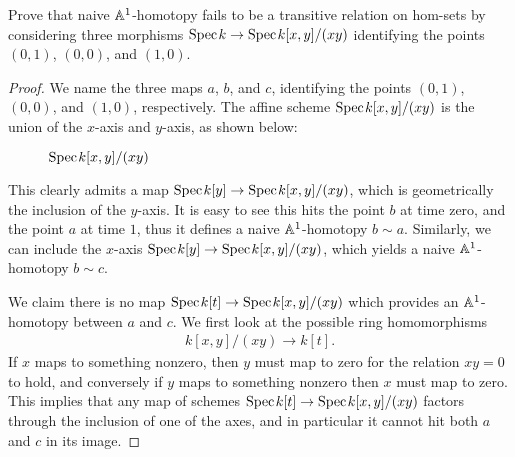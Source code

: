 \documentclass[english]{article}
\begin{document}
\setcounter{subsection}{4}
\setcounter{theorem}{0}
\begin{exercise}\cite{Asok-notes} Prove that naive $\mathbb{A}^1$-homotopy fails to be a transitive relation on hom-sets by considering three morphisms $\text{Spec}\hspace{0.1em} k \to \text{Spec}\hspace{0.1em} k[x,y]/(xy)$ identifying the points $(0,1)$, $(0,0)$, and $(1,0)$.
\end{exercise}
\begin{proof} We name the three maps $a$, $b$, and $c$, identifying the points $(0,1)$, $(0,0)$, and $(1,0)$, respectively. The affine scheme $\text{Spec}\hspace{0.1em} k[x,y]/(xy)$ is the union of the $x$-axis and $y$-axis, as shown below:
\begin{figure}[H]
\begin{center}
\end{center}
\caption{$\text{Spec}\hspace{0.1em} k[x,y]/(xy)$}%
\end{figure}

This clearly admits a map $\text{Spec}\hspace{0.1em} k[y] \to \text{Spec}\hspace{0.1em} k[x,y]/(xy)$, which is geometrically the inclusion of the $y$-axis. It is easy to see this hits the point $b$ at time zero, and the point $a$ at time $1$, thus it defines a naive $\mathbb{A}^1$-homotopy $b\sim a$. Similarly, we can include the $x$-axis $\text{Spec}\hspace{0.1em} k[y] \to \text{Spec}\hspace{0.1em} k[x,y]/(xy)$, which yields a naive $\mathbb{A}^1$-homotopy $b\sim c$.

We claim there is no map $\text{Spec}\hspace{0.1em} k[t] \to \text{Spec}\hspace{0.1em} k[x,y]/(xy)$ which provides an $\mathbb{A}^1$-homotopy between $a$ and $c$. We first look at the possible ring homomorphisms
\begin{align*}
    k[x,y]/(xy) \to k[t].
\end{align*}
If $x$ maps to something nonzero, then $y$ must map to zero for the relation $xy=0$ to hold, and conversely if $y$ maps to something nonzero then $x$ must map to zero. This implies that any map of schemes $\text{Spec}\hspace{0.1em} k[t] \to \text{Spec}\hspace{0.1em} k[x,y]/(xy)$ factors through the inclusion of one of the axes, and in particular it cannot hit both $a$ and $c$ in its image.


\end{proof}
\end{document}
